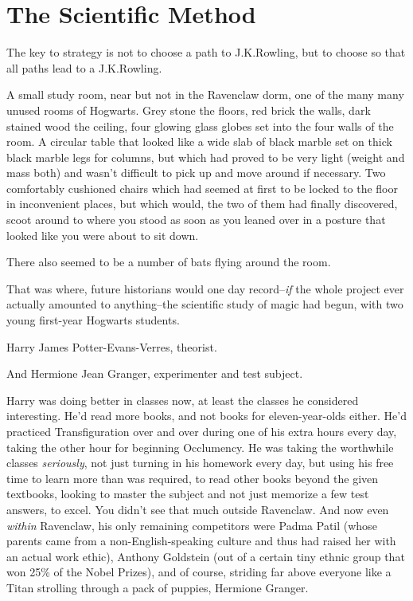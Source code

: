 \chapter{The Scientific Method}

\begin{chapterOpeningAuthorNote}
The key to strategy is not to choose a path to J.\?K.\?Rowling, but to choose so that all paths lead to a J.\?K.\?Rowling.
\end{chapterOpeningAuthorNote}

\lettrine{A}{} small study room, near but not in the Ravenclaw dorm, one of the many many unused rooms of Hogwarts. Grey stone the floors, red brick the walls, dark stained wood the ceiling, four glowing glass globes set into the four walls of the room. A circular table that looked like a wide slab of black marble set on thick black marble legs for columns, but which had proved to be very light (weight and mass both) and wasn't difficult to pick up and move around if necessary. Two comfortably cushioned chairs which had seemed at first to be locked to the floor in inconvenient places, but which would, the two of them had finally discovered, scoot around to where you stood as soon as you leaned over in a posture that looked like you were about to sit down.

There also seemed to be a number of bats flying around the room.

That was where, future historians would one day record\---\emph{if} the whole project ever actually amounted to anything\---the scientific study of magic had begun, with two young first-year Hogwarts students.

Harry James Potter-Evans-Verres, theorist.

And Hermione Jean Granger, experimenter and test subject.

Harry was doing better in classes now, at least the classes he considered interesting. He'd read more books, and not books for eleven-year-olds either. He'd practiced Transfiguration over and over during one of his extra hours every day, taking the other hour for beginning Occlumency. He was taking the worthwhile classes \emph{seriously}, not just turning in his homework every day, but using his free time to learn more than was required, to read other books beyond the given textbooks, looking to master the subject and not just memorize a few test answers, to excel. You didn't see that much outside Ravenclaw. And now even \emph{within} Ravenclaw, his only remaining competitors were Padma Patil (whose parents came from a non-English-speaking culture and thus had raised her with an actual work ethic), Anthony Goldstein (out of a certain tiny ethnic group that won 25\% of the Nobel Prizes), and of course, striding far above everyone like a Titan strolling through a pack of puppies, Hermione Granger.

